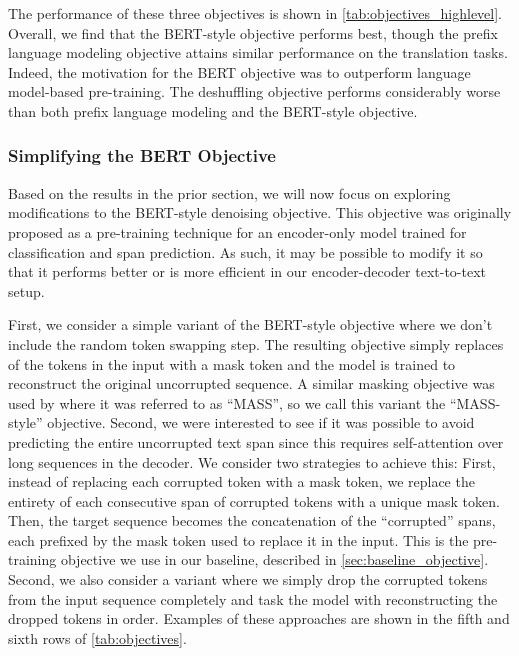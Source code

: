 \documentclass[twoside,11pt]{article}
\begin{document}
The performance of these three objectives is shown in \cref{tab:objectives_highlevel}.
Overall, we find that the BERT-style objective performs best, though the prefix language modeling objective attains similar performance on the translation tasks.
Indeed, the motivation for the BERT objective was to outperform language model-based pre-training.
The deshuffling objective performs considerably worse than both prefix language modeling and the BERT-style objective.

\subsubsection{Simplifying the BERT Objective}
\label{sec:simplifying_bert}

Based on the results in the prior section, we will now focus on exploring modifications to the BERT-style denoising objective.
This objective was originally proposed as a pre-training technique for an encoder-only model trained for classification and span prediction.
As such, it may be possible to modify it so that it performs better or is more efficient in our encoder-decoder text-to-text setup.

First, we consider a simple variant of the BERT-style objective where we don't include the random token swapping step.
The resulting objective simply replaces  of the tokens in the input with a mask token and the model is trained to reconstruct the original uncorrupted sequence.
A similar masking objective was used by \cite{song2019mass} where it was referred to as ``MASS'', so we call this variant the ``MASS-style'' objective.
Second, we were interested to see if it was possible to avoid predicting the entire uncorrupted text span since this requires self-attention over long sequences in the decoder.
We consider two strategies to achieve this:
First, instead of replacing each corrupted token with a mask token, we replace the entirety of each consecutive span of corrupted tokens with a unique mask token.
Then, the target sequence becomes the concatenation of the ``corrupted'' spans, each prefixed by the mask token used to replace it in the input.
This is the pre-training objective we use in our baseline, described in \cref{sec:baseline_objective}.
Second, we also consider a variant where we simply drop the corrupted tokens from the input sequence completely and task the model with reconstructing the dropped tokens in order.
Examples of these approaches are shown in the fifth and sixth rows of \cref{tab:objectives}.
\end{document}
